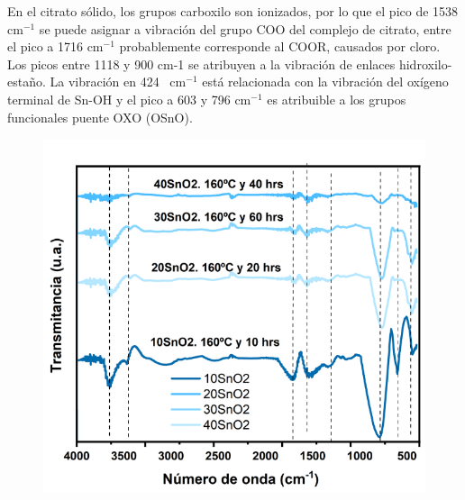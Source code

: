 \documentclass[12pt]{article}
\begin{document}
En el citrato sólido, los grupos carboxilo son ionizados, por lo que el pico de 1538 cm$\displaystyle ^{-1}$ se puede asignar a vibración del grupo COO del complejo de citrato, entre el pico a 1716 cm$\displaystyle ^{-1}$ probablemente corresponde al COOR, causados por cloro. Los picos entre 1118 y 900 cm-1 se atribuyen a la vibración de enlaces hidroxilo-estaño. La vibración en 424 \ cm$\displaystyle ^{-1}$ está relacionada con la vibración del oxígeno terminal de Sn-OH y el pico a 603 y 796 cm$\displaystyle ^{-1}$ es atribuible a los grupos funcionales puente OXO (OSnO).
\begin{figure}[H]
    	   \begin{center}
     	  	\includegraphics[width = 1\textwidth]{Imagenes/SnO2_FTIR_2.png}
    	   \end{center} 
        \end{figure}
\end{document}
